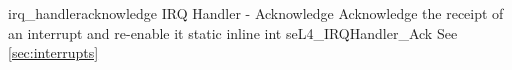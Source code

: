 %
%
%
%

\apidoc
{irq_handleracknowledge}
{IRQ Handler - Acknowledge}
{Acknowledge the receipt of an interrupt and re-enable it}
{static inline int seL4\_IRQHandler\_Ack }
{
}
{\errorenumdesc}
{See \autoref{sec:interrupts}}
